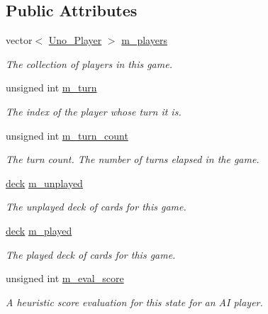 \subsection*{\-Public \-Attributes}
\begin{DoxyCompactItemize}
\item 
\hypertarget{class_uno___game___state_adff61ccfa1552c4524e781aeee6ed95a}{
vector$<$ \hyperlink{class_uno___player}{\-Uno\-\_\-\-Player} $>$ \hyperlink{class_uno___game___state_adff61ccfa1552c4524e781aeee6ed95a}{m\-\_\-players}}
\label{class_uno___game___state_adff61ccfa1552c4524e781aeee6ed95a}

\begin{DoxyCompactList}\small\item\em \-The collection of players in this game. \end{DoxyCompactList}\item 
\hypertarget{class_uno___game___state_a85a2ea5d9e50359519aeeef2589fa8cf}{
unsigned int \hyperlink{class_uno___game___state_a85a2ea5d9e50359519aeeef2589fa8cf}{m\-\_\-turn}}
\label{class_uno___game___state_a85a2ea5d9e50359519aeeef2589fa8cf}

\begin{DoxyCompactList}\small\item\em \-The index of the player whose turn it is. \end{DoxyCompactList}\item 
\hypertarget{class_uno___game___state_abc3bb6447a74a7bf28c1dfbbfdcd6d55}{
unsigned int \hyperlink{class_uno___game___state_abc3bb6447a74a7bf28c1dfbbfdcd6d55}{m\-\_\-turn\-\_\-count}}
\label{class_uno___game___state_abc3bb6447a74a7bf28c1dfbbfdcd6d55}

\begin{DoxyCompactList}\small\item\em \-The turn count. \-The number of turns elapsed in the game. \end{DoxyCompactList}\item 
\hyperlink{uno__deck_8h_ab634a15f4d19d3af113a71241b79c408}{deck} \hyperlink{class_uno___game___state_a7bf61c252c9de176f309b691b4038345}{m\-\_\-unplayed}
\begin{DoxyCompactList}\small\item\em \-The unplayed deck of cards for this game. \end{DoxyCompactList}\item 
\hyperlink{uno__deck_8h_ab634a15f4d19d3af113a71241b79c408}{deck} \hyperlink{class_uno___game___state_ae274bd2383addaefbc78556c48757c35}{m\-\_\-played}
\begin{DoxyCompactList}\small\item\em \-The played deck of cards for this game. \end{DoxyCompactList}\item 
unsigned int \hyperlink{class_uno___game___state_ad55fa08fbfc6ddf4359194857dbd99fc}{m\-\_\-eval\-\_\-score}
\begin{DoxyCompactList}\small\item\em \-A heuristic score evaluation for this state for an \-A\-I player. \end{DoxyCompactList}\end{DoxyCompactItemize}


